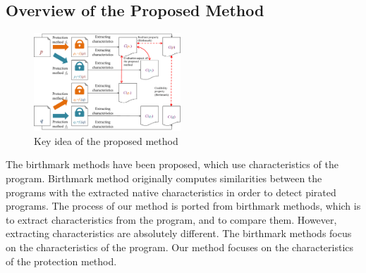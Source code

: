 \documentclass[conference]{IEEEtran}
\begin{document}
% 
% 

\subsection{Overview of the Proposed Method}

\begin{figure}[b]
  \centering
  \includegraphics[width=0.49\textwidth]{images/key_idea}
  \caption{Key idea of the proposed method}\label{fig:keyidea}
\end{figure}

The birthmark methods have been proposed, which use characteristics of
the program\cite{tamada05ieice}.  Birthmark method originally computes
similarities between the programs with the extracted native
characteristics in order to detect pirated programs.
%
The process of our method is ported from birthmark methods, which is
to extract characteristics from the program, and to compare them.
However, extracting characteristics are absolutely different.  The
birthmark methods focus on the characteristics of the program.  Our
method focuses on the characteristics of the protection method.
\end{document}
